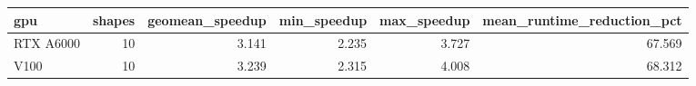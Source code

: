 \begin{tabular}{lrrrrr}
\toprule
gpu & shapes & geomean\_speedup & min\_speedup & max\_speedup & mean\_runtime\_reduction\_pct \\
\midrule
RTX A6000 & 10 & 3.141 & 2.235 & 3.727 & 67.569 \\
V100 & 10 & 3.239 & 2.315 & 4.008 & 68.312 \\
\bottomrule
\end{tabular}
